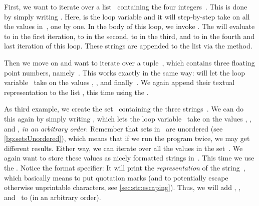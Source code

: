 First, we want to iterate over a list~ containing the four integers~\pythonil{[1, 2, 3, 50]}.
This is done by simply writing .
Here,  is the loop variable and it will step-by-step take on all the values in~, one by one.
In the body of this loop, we invoke .
The  will evaluate to  in the first iteration, to  in the second, to  in the third, and to  in the fourth and last iteration of this loop.
These strings are appended to the list  via the  method.

Then we move on and want to iterate over a tuple~, which contains three floating point numbers, namely~.
This works exactly in the same way:
 will let the loop variable~ take on the values , , and finally~.
We again append their textual representation to the list , this time using the  .

As third example, we create the set~ containing the three strings~.
We can do this again by simply writing , which lets the loop variable~ take on the values , , and , \emph{in an arbitrary order}.
Remember that sets in \python\ are unordered (see \cref{bp:setsUnordered}), which means that if we run the program twice, we may get different results.
Either way, we can iterate over all the values in the set~.
We again want to store these values as nicely formatted strings in~.
This time we use the  .
Notice the  format specifier:
It will print the \emph{representation} of the string~, which basically means to put quotation marks (and to potentially escape otherwise unprintable characters, see \cref{sec:str:escaping}).
Thus, we will add , , and~ to  (in an arbitrary order).

